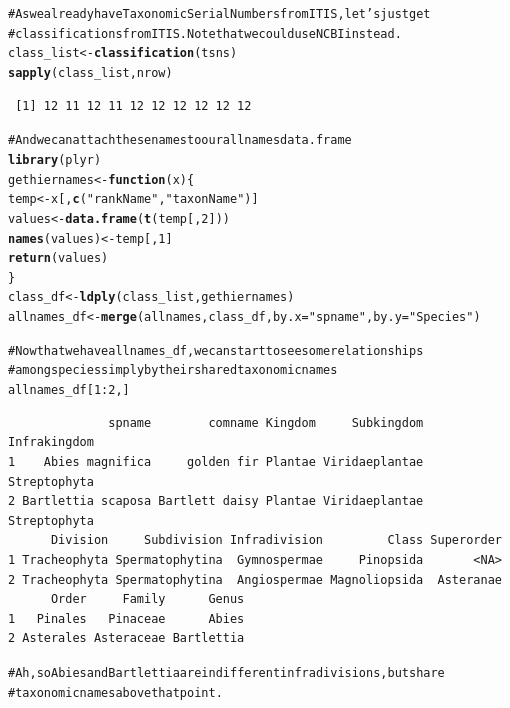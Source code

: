 \documentclass[letterpaper,superscriptaddress,showkeys,longbibliography,10pt]{revtex4-1}\usepackage{graphicx, color}
\makeatletter
\newcommand{\hlfunctioncall}[1]{\textcolor[rgb]{0.501960784313725,0,0.329411764705882}{\textbf{#1}}}%
\newcommand{\hlstring}[1]{\textcolor[rgb]{0.6,0.6,1}{#1}}%
\newcommand{\hlcomment}[1]{\textcolor[rgb]{0.180392156862745,0.6,0.341176470588235}{#1}}%
\newenvironment{kframe}{%
 \def\at@end@of@kframe{}%
 \ifinner\ifhmode%
  \def\at@end@of@kframe{\end{minipage}}%
  \begin{minipage}{\columnwidth}%
 \fi\fi%
 \def\FrameCommand##1{\hskip\@totalleftmargin \hskip-\fboxsep
 \colorbox{shadecolor}{##1}\hskip-\fboxsep
     \hskip-\linewidth \hskip-\@totalleftmargin \hskip\columnwidth}%
 \MakeFramed {\advance\hsize-\width
   \@totalleftmargin\z@ \linewidth\hsize
   \@setminipage}}%
 {\par\unskip\endMakeFramed%
 \at@end@of@kframe}
\newenvironment{knitrout}{}{} %
\makeatother
\begin{document}
\begin{appendices}
\begin{knitrout}
\color{fgcolor}\begin{kframe}
\begin{alltt}
\hlcomment{# As we already have Taxonomic Serial Numbers from ITIS, let's just get}
\hlcomment{# classifications from ITIS. Note that we could use NCBI instead.}
class_list <- \hlfunctioncall{classification}(tsns)
\hlfunctioncall{sapply}(class_list, nrow)
\end{alltt}
\begin{verbatim}
 [1] 12 11 12 11 12 12 12 12 12 12
\end{verbatim}
\begin{alltt}

\hlcomment{# And we can attach these names to our allnames data.frame}
\hlfunctioncall{library}(plyr)
gethiernames <- \hlfunctioncall{function}(x) \{
    temp <- x[, \hlfunctioncall{c}(\hlstring{"rankName"}, \hlstring{"taxonName"})]
    values <- \hlfunctioncall{data.frame}(\hlfunctioncall{t}(temp[, 2]))
    \hlfunctioncall{names}(values) <- temp[, 1]
    \hlfunctioncall{return}(values)
\}
class_df <- \hlfunctioncall{ldply}(class_list, gethiernames)
allnames_df <- \hlfunctioncall{merge}(allnames, class_df, by.x = \hlstring{"spname"}, by.y = \hlstring{"Species"})

\hlcomment{# Now that we have allnames_df, we can start to see some relationships}
\hlcomment{# among species simply by their shared taxonomic names}
allnames_df[1:2, ]
\end{alltt}
\begin{verbatim}
              spname        comname Kingdom     Subkingdom Infrakingdom
1    Abies magnifica     golden fir Plantae Viridaeplantae Streptophyta
2 Bartlettia scaposa Bartlett daisy Plantae Viridaeplantae Streptophyta
      Division     Subdivision Infradivision         Class Superorder
1 Tracheophyta Spermatophytina  Gymnospermae     Pinopsida       <NA>
2 Tracheophyta Spermatophytina  Angiospermae Magnoliopsida  Asteranae
      Order     Family      Genus
1   Pinales   Pinaceae      Abies
2 Asterales Asteraceae Bartlettia
\end{verbatim}
\begin{alltt}

\hlcomment{# Ah, so Abies and Bartlettia are in different infradivisions, but share}
\hlcomment{# taxonomic names above that point.}
\end{alltt}
\end{kframe}
\end{knitrout}



\end{appendices}
\end{document}
